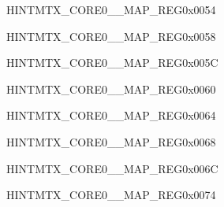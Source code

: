 \begin{register}{H}{INTMTX\_CORE0\_\_MAP\_REG}{0x0054}\label{regdesc:INTMTXCORE0LPAPMM1INTRMAPREG}
\end{register}\vspace{-3em}


\begin{register}{H}{INTMTX\_CORE0\_\_MAP\_REG}{0x0058}\label{regdesc:INTMTXCORE0CPUINTRFROMCPU0MAPREG}
\end{register}\vspace{-3em}


\begin{register}{H}{INTMTX\_CORE0\_\_MAP\_REG}{0x005C}\label{regdesc:INTMTXCORE0CPUINTRFROMCPU1MAPREG}
\end{register}\vspace{-3em}


\begin{register}{H}{INTMTX\_CORE0\_\_MAP\_REG}{0x0060}\label{regdesc:INTMTXCORE0CPUINTRFROMCPU2MAPREG}
\end{register}\vspace{-3em}


\begin{register}{H}{INTMTX\_CORE0\_\_MAP\_REG}{0x0064}\label{regdesc:INTMTXCORE0CPUINTRFROMCPU3MAPREG}
\end{register}\vspace{-3em}


\begin{register}{H}{INTMTX\_CORE0\_\_MAP\_REG}{0x0068}\label{regdesc:INTMTXCORE0ASSISTDEBUGINTRMAPREG}
\end{register}\vspace{-3em}


\begin{register}{H}{INTMTX\_CORE0\_\_MAP\_REG}{0x006C}\label{regdesc:INTMTXCORE0TRACEINTRMAPREG}
\end{register}\vspace{-3em}




\begin{register}{H}{INTMTX\_CORE0\_\_MAP\_REG}{0x0074}\label{regdesc:INTMTXCORE0CPUPERITIMEOUTINTRMAPREG}
\end{register}\vspace{-3em}
















